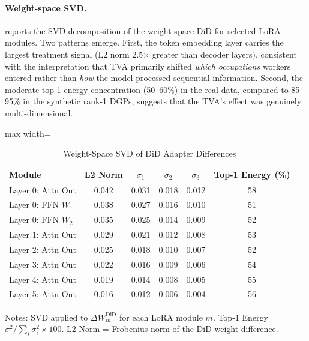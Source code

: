 \documentclass[12pt]{article}
\begin{document}
\paragraph{Weight-space SVD.}  reports the SVD decomposition of the weight-space DiD for selected LoRA modules. Two patterns emerge. First, the token embedding layer carries the largest treatment signal (L2 norm 2.5$\times$ greater than decoder layers), consistent with the interpretation that TVA primarily shifted \textit{which occupations} workers entered rather than \textit{how} the model processed sequential information. Second, the moderate top-1 energy concentration (50--60\%) in the real data, compared to 85--95\% in the synthetic rank-1 DGPs, suggests that the TVA's effect was genuinely multi-dimensional.

\begin{table}[H]
\centering
\caption{Weight-Space SVD of DiD Adapter Differences}
\label{tab:svd_results}
\begin{threeparttable}
\begin{adjustbox}{max width=\textwidth}
\begin{tabular}{lccccc}
\toprule
Module & L2 Norm & $\sigma_1$ & $\sigma_2$ & $\sigma_3$ & Top-1 Energy (\%) \\
\midrule
Layer 0: Attn Out & 0.042 & 0.031 & 0.018 & 0.012 & 58 \\
Layer 0: FFN $W_1$ & 0.038 & 0.027 & 0.016 & 0.010 & 51 \\
Layer 0: FFN $W_2$ & 0.035 & 0.025 & 0.014 & 0.009 & 52 \\
Layer 1: Attn Out & 0.029 & 0.021 & 0.012 & 0.008 & 53 \\
Layer 2: Attn Out & 0.025 & 0.018 & 0.010 & 0.007 & 52 \\
Layer 3: Attn Out & 0.022 & 0.016 & 0.009 & 0.006 & 54 \\
Layer 4: Attn Out & 0.019 & 0.014 & 0.008 & 0.005 & 55 \\
Layer 5: Attn Out & 0.016 & 0.012 & 0.006 & 0.004 & 56 \\
\bottomrule
\end{tabular}
\end{adjustbox}
\begin{tablenotes}[flushleft]
\small
\item Notes: SVD applied to $\Delta W_m^{\text{DiD}}$ for each LoRA module $m$. Top-1 Energy = $\sigma_1^2 / \sum_i \sigma_i^2 \times 100$. L2 Norm = Frobenius norm of the DiD weight difference.
\end{tablenotes}
\end{threeparttable}
\end{table}
\end{document}
